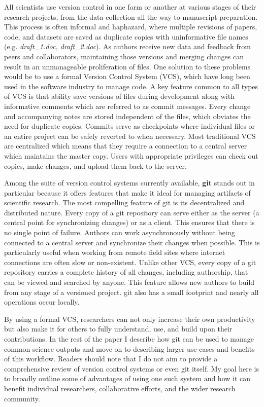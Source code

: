 \documentclass[]{article}
\begin{document}
All scientists use version control in one form or another at various
stages of their research projects, from the data collection all the way
to manuscript preparation. This process is often informal and haphazard,
where multiple revisions of papers, code, and datasets are saved as
duplicate copies with uninformative file names (e.g. \emph{draft\_1.doc,
draft\_2.doc}). As authors receive new data and feedback from peers and
collaborators, maintaining those versions and merging changes can result
in an unmanageable proliferation of files. One solution to these
problems would be to use a formal Version Control System (VCS), which
have long been used in the software industry to manage code. A key
feature common to all types of VCS is that ability save versions of
files during development along with informative comments which are
referred to as commit messages. Every change and accompanying notes are
stored independent of the files, which obviates the need for duplicate
copies. Commits serve as checkpoints where individual files or an entire
project can be safely reverted to when necessary. Most traditional VCS
are centralized which means that they require a connection to a central
server which maintains the master copy. Users with appropriate
privileges can check out copies, make changes, and upload them back to
the server.

Among the suite of version control systems currently available,
\textbf{git} stands out in particular because it offers features that
make it ideal for managing artifacts of scientific research. The most
compelling feature of git is its decentralized and distributed nature.
Every copy of a git repository can serve either as the server (a central
point for synchronizing changes) or as a client. This ensures that there
is no single point of failure. Authors can work asynchronously without
being connected to a central server and synchronize their changes when
possible. This is particularly useful when working from remote field
sites where internet connections are often slow or non-existent. Unlike
other VCS, every copy of a git repository carries a complete history of
all changes, including authorship, that can be viewed and searched by
anyone. This feature allows new authors to build from any stage of a
versioned project. git also has a small footprint and nearly all
operations occur locally.

By using a formal VCS, researchers can not only increase their own
productivity but also make it for others to fully understand, use, and
build upon their contributions. In the rest of the paper I describe how
git can be used to manage common science outputs and move on to
describing larger use-cases and benefits of this workflow. Readers
should note that I do not aim to provide a comprehensive review of
version control systems or even git itself. My goal here is to broadly
outline some of advantages of using one such system and how it can
benefit individual researchers, collaborative efforts, and the wider
research community.
\end{document}
